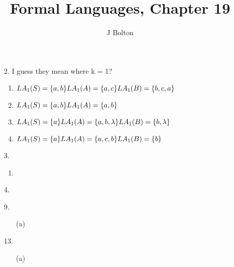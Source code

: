 \documentclass{article}
\title{Formal Languages, Chapter 19}
\author{J Bolton}
\begin{document}
\maketitle

\begin{enumerate}
\item[2.] I guess they mean where k = 1?
  \begin{enumerate}
  \item 
$
LA_{1}(S) = \{a, b\} \\
LA_{1}(A) = \{a, c\} \\
LA_{1}(B) = \{b, c, a\} \\
$
\item
$
LA_{1}(S) = \{a, b\} \\
LA_{1}(A) = \{a, b\} \\
$
\item
$
LA_{1}(S) = \{a\} \\
LA_{1}(A) = \{a, b, \lambda\} \\
LA_{1}(B) = \{b, \lambda\} \\
$
\item
$
LA_{1}(S) = \{a\} \\
LA_{1}(A) = \{a, c, b\} \\
LA_{1}(B) = \{b\} \\
$
  \end{enumerate}

\item[3.]
  \begin{enumerate}
  \item 

  \end{enumerate}

\item[4.]

\item[9.]
  \begin{enumerate}
  \item[(a)]
  \end{enumerate}

\item[13.]
  \begin{enumerate}
  \item[(a)]
  \end{enumerate}
\end{enumerate}
\end{document}
